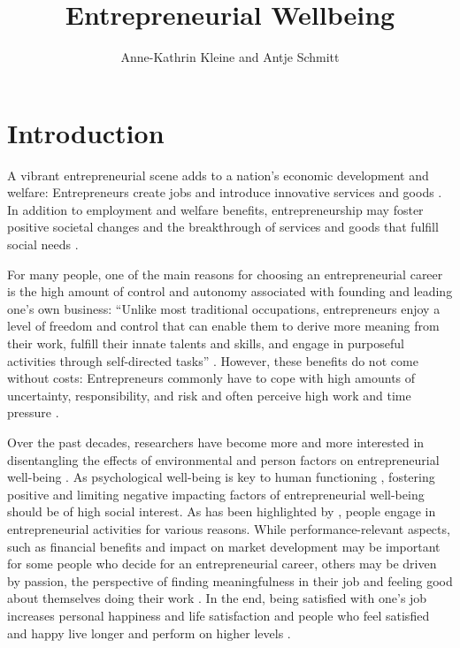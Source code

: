 \documentclass[a4paper,man,noextraspace,natbib]{apa6}
\title{Entrepreneurial Wellbeing}
\author{Anne-Kathrin Kleine and Antje Schmitt}
\affiliation{University of Groningen}
\begin{document}
\maketitle

\section{Introduction}
A vibrant entrepreneurial scene adds to a nation’s economic development and welfare: 
Entrepreneurs create jobs and introduce innovative services and goods \citep{Acs.1988, Schumpeter.1934}. 
In addition to employment and welfare benefits, entrepreneurship may foster positive societal changes and the breakthrough of services and goods that fulfill social needs \cite[e.g.][]{Certo2008, Stephan2018, Wiklund2019}. \par 

For many people, one of the main reasons for choosing an entrepreneurial career is the high amount of control and autonomy associated with founding and leading one's own business: 
“Unlike most traditional occupations, entrepreneurs enjoy a level of freedom and control that can enable them to derive more meaning from their work, fulfill their innate talents and skills, and engage in purposeful activities through self-directed tasks” \cite[p.~580] {Wiklund2019}. 
However, these benefits do not come without costs: 
Entrepreneurs commonly have to cope with high amounts of uncertainty, responsibility, and risk and often perceive high work and time pressure \citep{Stephan2018}. \par

Over the past decades, researchers have become more and more interested in disentangling the effects of environmental and person factors on entrepreneurial well-being \cite[e.g.][]{Stephan.2018, Shir.2019, Carter2011, Baron2008}. 
As psychological well-being is key to human functioning \citep{Aldwin1987}, fostering positive and limiting negative impacting factors of entrepreneurial well-being should be of high social interest. 
As has been highlighted by \cite{Wiklund2019}, people engage in entrepreneurial activities for various reasons. 
While performance-relevant aspects, such as financial benefits and impact on market development may be important for some people who decide for an entrepreneurial career, others may be driven by passion, the perspective of finding meaningfulness in their job and feeling good about themselves doing their work \citep[e.g.][]{Cardon2008, Aguinis2019}. 
In the end, being satisfied with one's job increases personal happiness and life satisfaction \cite[e.g.][]{WEAVER1978, Unanue2017} and people who feel satisfied and happy live longer \citep{Diener2011} and perform on higher levels \citep{VanDeVoorde2012}. \par
\end{document}
